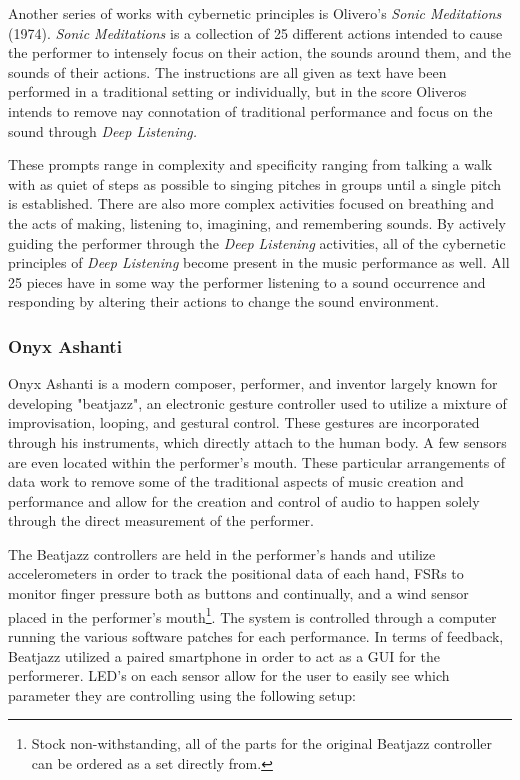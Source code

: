 Another series of works with cybernetic principles is Olivero's \textit{Sonic Meditations} (1974). \textit{Sonic Meditations} is a collection of 25 different actions intended to cause the performer to intensely focus on their action, the sounds around them, and the sounds of their actions\cite{OliverosMeditations}. The instructions are all given as text have been performed in a traditional setting or individually, but in the score Oliveros intends to remove nay connotation of traditional performance and focus on the sound through \textit{Deep Listening.} 

These prompts range in complexity and specificity ranging from talking a walk with as quiet of steps as possible to singing pitches in groups until a single pitch is established. There are also more complex activities focused on breathing and the acts of making, listening to, imagining, and remembering sounds\cite{OliverosMeditations}. By actively guiding the performer through the \textit{Deep Listening} activities, all of the cybernetic principles of \textit{Deep Listening} become present in the music performance as well. All 25 pieces have in some way the performer listening to a sound occurrence and responding by altering their actions to change the sound environment.

\subsubsection{Onyx Ashanti} 
Onyx Ashanti is a modern composer, performer, and inventor largely known for developing "beatjazz", an electronic gesture controller used to utilize a mixture of improvisation, looping, and gestural control. These gestures are incorporated through his instruments, which directly attach to the human body. A few sensors are even located within the performer's mouth. These particular arrangements of data work to remove some of the traditional aspects of music creation and performance and allow for the creation and control of audio to happen solely through the direct measurement of the performer.

The Beatjazz controllers are held in the performer's hands and utilize accelerometers in order to track the positional data of each hand, FSRs to monitor finger pressure both as buttons and continually, and a wind sensor placed in the performer's mouth\footnote{Stock non-withstanding, all of the parts for the original Beatjazz controller can be ordered as a set directly from.}. The system is controlled through a computer running the various software patches for each performance. In terms of feedback, Beatjazz utilized a paired smartphone in order to act as a GUI for the performerer. LED's on each sensor allow for the user to easily see which parameter they are controlling using the following setup:

